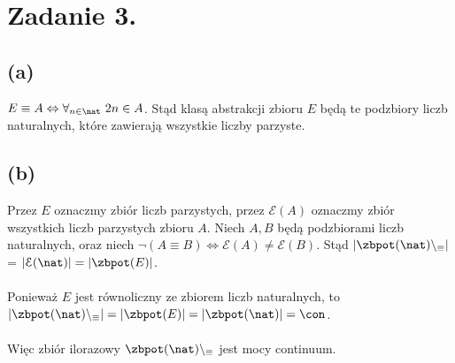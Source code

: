 \documentclass{article}
\begin{document}
\section*{Zadanie 3.}
\subsection*{(a)}
$E \equiv A \Leftrightarrow \forall_{n \in \nat} \ 2n \in A$. Stąd klasą abstrakcji zbioru $E$ będą te podzbiory liczb naturalnych, które zawierają wszystkie liczby parzyste.
\subsection*{(b)}
Przez $E$ oznaczmy zbiór liczb parzystych, przez $\mathcal{E} (A)$ oznaczmy zbiór wszystkich liczb parzystych zbioru $A$. 
Niech $A,B$ będą podzbiorami liczb naturalnych, oraz niech $\lnot(A \equiv B) \Leftrightarrow \mathcal{E} (A) \neq \mathcal{E} (B)$. Stąd $\vert \zbpot (\nat)\backslash_\equiv \vert$ = $\vert \mathcal{E} (\nat) \vert = \vert \zbpot(E) \vert$.
\\\\
Ponieważ $E$ jest równoliczny ze zbiorem liczb naturalnych, to
$\vert \zbpot (\nat)\backslash_\equiv \vert = \vert \zbpot(E) \vert = \vert \zbpot(\nat) \vert = \con$.
\\\\
Więc zbiór ilorazowy $\zbpot (\nat)\backslash_\equiv$ jest mocy continuum.
\end{document}
